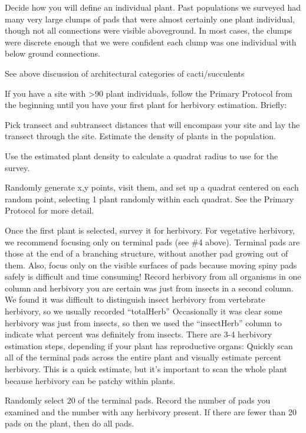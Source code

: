 \documentclass[
  letterpaper,
  DIV=11,
  numbers=noendperiod]{scrreprt}
\begin{document}
Decide how you will define an individual plant. Past populations we
surveyed had many very large clumps of pads that were almost certainly
one plant individual, though not all connections were visible
aboveground. In most cases, the clumps were discrete enough that we were
confident each clump was one individual with below ground connections.

See above discussion of architectural categories of cacti/succulents

If you have a site with \textgreater90 plant individuals, follow the
Primary Protocol from the beginning until you have your first plant for
herbivory estimation. Briefly:

Pick transect and subtransect distances that will encompass your site
and lay the transect through the site. Estimate the density of plants in
the population.

Use the estimated plant density to calculate a quadrat radius to use for
the survey.

Randomly generate x,y points, visit them, and set up a quadrat centered
on each random point, selecting 1 plant randomly within each quadrat.
See the Primary Protocol for more detail.

Once the first plant is selected, survey it for herbivory. For
vegetative herbivory, we recommend focusing only on terminal pads (see
\#4 above). Terminal pads are those at the end of a branching structure,
without another pad growing out of them. Also, focus only on the visible
surfaces of pads because moving spiny pads safely is difficult and time
consuming! Record herbivory from all organisms in one column and
herbivory you are certain was just from insects in a second column. We
found it was difficult to distinguish insect herbivory from vertebrate
herbivory, so we usually recorded ``totalHerb'' Occasionally it was
clear some herbivory was just from insects, so then we used the
``insectHerb'' column to indicate what percent was definitely from
insects. There are 3-4 herbivory estimation steps, depending if your
plant has reproductive organs: Quickly scan all of the terminal pads
across the entire plant and visually estimate percent herbivory. This is
a quick estimate, but it's important to scan the whole plant because
herbivory can be patchy within plants.

Randomly select 20 of the terminal pads. Record the number of pads you
examined and the number with any herbivory present. If there are fewer
than 20 pads on the plant, then do all pads.
\end{document}
